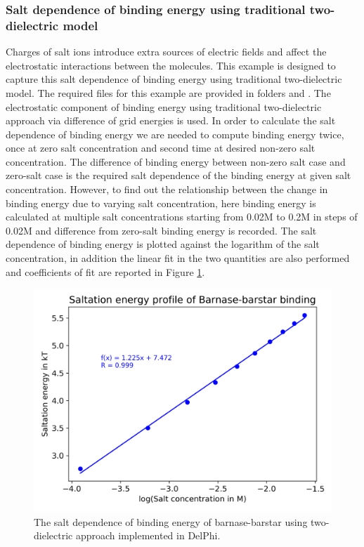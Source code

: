 \documentclass[9pt,tutorial,pubversion]{livecoms}
\newcommand*\ttvar[1]{\texttt{\expandafter\dottvar\detokenize{#1}\relax}}
\newcommand*\dottvar[1]{\ifx\relax#1\else
  \expandafter\ifx\string_#1\string_\allowbreak\else#1\fi
  \expandafter\dottvar\fi}
\begin{document}
\subsubsection{Salt dependence of binding energy using traditional two-dielectric model} \label{sec:slat-dependence-of-binding-energy-using-two-dielectric-model}
Charges of salt ions introduce extra sources of electric fields and affect the electrostatic interactions between the molecules. This example is designed to capture this salt dependence of binding energy using traditional two-dielectric model. The required files for this example are provided in folders \ttvar{Example_3.1.7/} and \ttvar{Example_3.1.7/saltation/}. The electrostatic component of binding energy using traditional two-dielectric approach via difference of grid energies  is used. In order to calculate the salt dependence of binding energy we are needed to compute binding energy twice, once at zero salt concentration and second time at desired non-zero salt concentration. The difference of binding energy between non-zero salt case and zero-salt case is the required salt dependence of the binding energy at given salt concentration. However, to find out the relationship between the change in binding energy due to varying salt concentration, here binding energy is calculated at multiple salt concentrations starting from 0.02M to 0.2M in steps of 0.02M and difference from zero-salt binding energy is recorded. The salt dependence of binding energy is plotted against the logarithm of the salt concentration, in addition the linear fit in the two quantities are also performed and coefficients of fit are reported in Figure \ref{fig:plot_saltation_pp_binding}.

\begin{figure}[hbt!]
\includegraphics[width=\linewidth]{Figure_13.png}
\caption{The salt dependence of binding energy of barnase-barstar using two-dielectric approach implemented in DelPhi.}
\label{fig:plot_saltation_pp_binding}
\end{figure}
\end{document}
